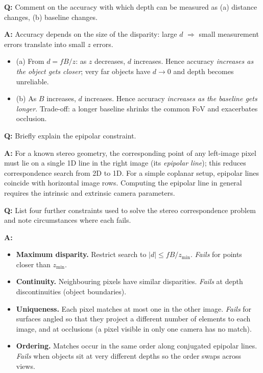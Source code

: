 \begin{exbox}
\textbf{Q:} Comment on the accuracy with which depth can be measured as (a) distance changes, (b) baseline changes.

\textbf{A:} Accuracy depends on the size of the disparity: large $d$ $\Rightarrow$ small measurement errors translate into small $z$ errors.
\begin{itemize}
  \item (a) From $d = fB/z$: as $z$ decreases, $d$ increases. Hence accuracy \emph{increases as the object gets closer}; very far objects have $d \to 0$ and depth becomes unreliable.
  \item (b) As $B$ increases, $d$ increases. Hence accuracy \emph{increases as the baseline gets longer}. Trade-off: a longer baseline shrinks the common FoV and exacerbates occlusion.
\end{itemize}
\end{exbox}

\begin{exbox}
\textbf{Q:} Briefly explain the epipolar constraint.

\textbf{A:} For a known stereo geometry, the corresponding point of any left-image pixel must lie on a single 1D line in the right image (its \emph{epipolar line}); this reduces correspondence search from 2D to 1D. For a simple coplanar setup, epipolar lines coincide with horizontal image rows. Computing the epipolar line in general requires the intrinsic and extrinsic camera parameters.
\end{exbox}

\begin{exbox}
\textbf{Q:} List four further constraints used to solve the stereo correspondence problem and note circumstances where each fails.

\textbf{A:}
\begin{itemize}
  \item \textbf{Maximum disparity.} Restrict search to $|d| \leq fB/z_{\min}$. \emph{Fails} for points closer than $z_{\min}$.
  \item \textbf{Continuity.} Neighbouring pixels have similar disparities. \emph{Fails} at depth discontinuities (object boundaries).
  \item \textbf{Uniqueness.} Each pixel matches at most one in the other image. \emph{Fails} for surfaces angled so that they project a different number of elements to each image, and at occlusions (a pixel visible in only one camera has no match).
  \item \textbf{Ordering.} Matches occur in the same order along conjugated epipolar lines. \emph{Fails} when objects sit at very different depths so the order swaps across views.
\end{itemize}
\end{exbox}

